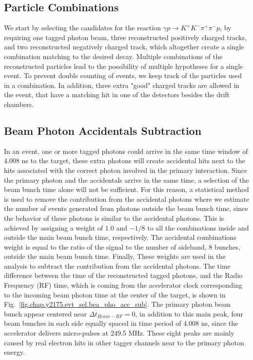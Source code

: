 \subsection{Particle Combinations}
\label{chap.y2175.evt_sel.par_com}

We start by selecting the candidates for the reaction $\gamma p \rightarrow K^+ K^- \pi^+ \pi^- p$, by requiring one tagged photon beam, three reconstructed positively charged tracks, and two reconstructed negatively charged track, which altogether create a single combination matching to the desired decay. Multiple combinations of the reconstructed particles lead to the possibility of multiple hypotheses for a single event. To prevent double counting of events, we keep track of the particles used in a combination.  In addition, three extra "good" charged tracks are allowed in the event, that have a matching hit in one of the detectors besides the drift chambers.

\subsection{Beam Photon Accidentals Subtraction}
\label{chap.y2175.evt_sel.bea_pho_acc_sub}

In an event, one or more tagged photons could arrive in the same time window of $4.008$ ns to the target, these extra photons will create accidental hits next to the hits associated with the correct photon involved in the primary interaction. Since the primary photon and the accidentals arrive in the same time, a selection of the beam bunch time alone will not be sufficient. For this reason, a statistical method is used to remove the contribution from the accidental photons where we estimate the number of events generated from photons outside the beam bunch time, since the behavior of these photons is similar to the accidental photons. This is achieved by assigning a weight of $1.0$ and $-1/8$ to all the combinations inside and outside the main beam bunch time, respectively. The accidental combinations weight is equal to the ratio of the signal to the number of sideband, 8 bunches, outside the main beam bunch time. Finally, These weights are used in the analysis to subtract the contribution from the accidental photons. The time difference between the time of the reconstructed tagged photons, and the Radio Frequency (RF) time, which is coming from the accelerator clock corresponding to the incoming beam photon time at the center of the target, is shown in Fig.~\ref{fig.chap.y2175.evt_sel.bea_pho_acc_sub}. The primary photon beam bunch appear centered near $\Delta t_{Beam-RF} = 0$, in addition to this main peak, four beam bunches in each side equally spaced in time period of 4.008 ns, since the accelerator delivers micro-pulses at 249.5 MHz. These eight peaks are mainly caused by real electron hits in other tagger channels near to the primary photon energy.

